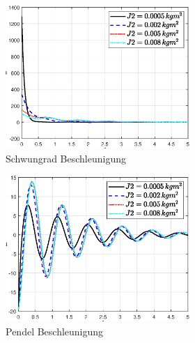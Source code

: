 \begin{figure}
\begin{figure}
\begin{subfigure}[b]{0.49 \linewidth}
        \includegraphics[width=\linewidth]{Bilder/5_sensi/fig/j2/phi_punkt_punkt.eps}
        \caption{Schwungrad Beschleunigung}
        \label{fig:j2_phi_punkt_punkt}
    \end{subfigure}
    \begin{subfigure}[b]{0.49 \linewidth}
        \includegraphics[width=\linewidth]{Bilder/5_sensi/fig/j2/theta_punkt_punkt.eps}
        \caption{Pendel Beschleunigung}
        \label{fig:j2_theta_punkt_punkt}
    \end{subfigure}
    \begin{subfigure}[b]{0.49\linewidth}

\end{subfigure}
\end{figure}
\end{figure}

